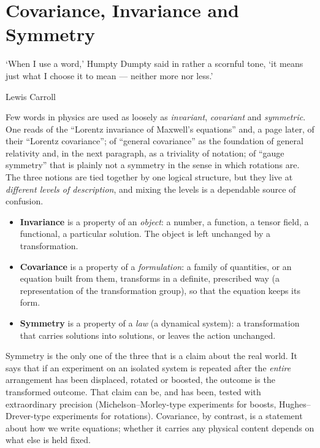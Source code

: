 \section{Covariance, Invariance and Symmetry}
\label{sec:cm-cis}
\epigraph{‘When I use a word,’ Humpty Dumpty said in rather a scornful tone,
‘it means just what I choose it to mean --- neither more nor less.’} {Lewis
Carroll}

Few words in physics are used as loosely as \emph{invariant}, \emph{covariant}
and \emph{symmetric}. One reads of the ``Lorentz invariance of Maxwell's
equations'' and, a page later, of their ``Lorentz covariance''; of ``general
covariance'' as the foundation of general relativity and, in the next
paragraph, as a triviality of notation; of ``gauge symmetry'' that is plainly
not a symmetry in the sense in which rotations are. The three notions are
tied together by one logical structure, but they live at \emph{different
levels of description}, and mixing the levels is a dependable source of
confusion.

\begin{itemize}
\item \textbf{Invariance} is a property of an \emph{object}: a number, a
  function, a tensor field, a functional, a particular solution. The object is
  left unchanged by a transformation.
\item \textbf{Covariance} is a property of a \emph{formulation}: a family of
  quantities, or an equation built from them, transforms in a definite,
  prescribed way (a representation of the transformation group), so that the
  equation keeps its form.
\item \textbf{Symmetry} is a property of a \emph{law} (a dynamical system): a
  transformation that carries solutions into solutions, or leaves the action
  unchanged.
\end{itemize}

Symmetry is the only one of the three that is a claim about the real world. It
says that if an experiment on an isolated system is repeated after the
\emph{entire} arrangement has been displaced, rotated or boosted, the outcome
is the transformed outcome. That claim can be, and has been, tested with
extraordinary precision (Michelson--Morley-type experiments for boosts,
Hughes--Drever-type experiments for rotations). Covariance, by contrast, is
a statement about how we write equations; whether it carries any physical
content depends on what else is held fixed.

